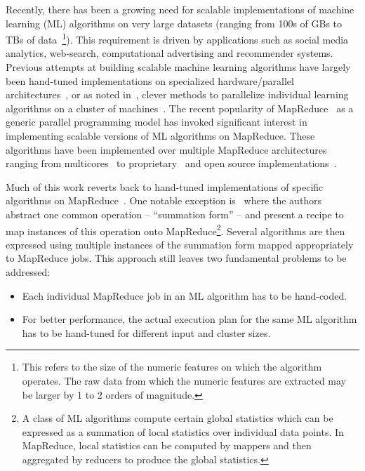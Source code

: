 Recently, there has been a growing need for scalable implementations of machine learning (ML)
algorithms on very large datasets (ranging from 100s of GBs to TBs of data~\footnote{This refers to
the size of the numeric features on which the algorithm operates. The raw data from which the
numeric features are extracted may be larger by 1 to 2 orders of magnitude.}). This requirement is
driven by applications such as social media analytics, web-search, computational
advertising and recommender systems.  Previous attempts at building scalable machine learning algorithms have largely been
hand-tuned implementations on specialized hardware/parallel architectures~\cite{SVMgpu}, or as noted
in~\cite{nips06}, clever methods to parallelize individual learning algorithms on a cluster of
machines~\cite{cascadesvm, paralleltutorial,parallelnmf}.  The recent popularity of MapReduce~\cite{mapreduce} as a
generic parallel programming model has invoked significant interest in implementing scalable
versions of ML algorithms on MapReduce. These algorithms have been implemented over multiple
MapReduce architectures~\cite{phoenix, scope, hadoop} ranging from multicores~\cite{nips06} to
proprietary~\cite{msrwww10,googlewww07, planet} and open source implementations~\cite{mahout}.

Much of this work reverts back to hand-tuned implementations of specific algorithms on
MapReduce~\cite{msrwww10, googlewww07}. One notable exception is~\cite{nips06} where the authors
abstract one common operation -- ``summation form'' -- and present a recipe to map instances of this
operation onto MapReduce\footnote{A class of ML algorithms compute certain global statistics which
can be expressed as a summation of local statistics over individual data points. In MapReduce, local
statistics can be computed by mappers and then aggregated by reducers to produce the global
statistics.}. Several algorithms are then expressed using multiple instances of the summation form
mapped appropriately to MapReduce jobs. This approach still leaves two fundamental problems to be
addressed:
 
\begin{itemize}
\item Each individual MapReduce job in an ML algorithm
has to be hand-coded. 
\item For better performance, the actual execution plan for the same ML algorithm has to be hand-tuned for different input and cluster sizes.
\end{itemize}

